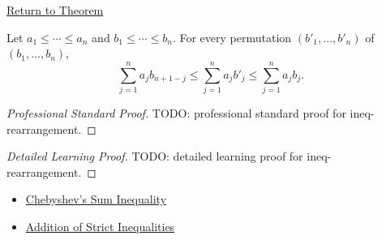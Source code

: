 \newpage
{}
\label{prf:ineq-rearrangement}

\begin{remark*}[Return]
\hyperref[thm:ineq-rearrangement]{Return to Theorem}
\end{remark*}

\begin{theorem*}
Let $a_1\le\cdots\le a_n$ and $b_1\le\cdots\le b_n$. For every permutation
$(b'_1,\dots,b'_n)$ of $(b_1,\dots,b_n)$,
\[
\sum_{j=1}^{n}a_jb_{n+1-j}
\le
\sum_{j=1}^{n}a_jb'_j
\le
\sum_{j=1}^{n}a_jb_j.
\]
\end{theorem*}

\begin{proof}[Professional Standard Proof]
\LRAProofBodyStart
TODO: professional standard proof for ineq-rearrangement.
\end{proof}

\begin{proof}[Detailed Learning Proof]
\LRAProofBodyStart
TODO: detailed learning proof for ineq-rearrangement.
\end{proof}

\begin{remark*}
\end{remark*}

\begin{dependencies}
\begin{itemize}
  \item \hyperref[thm:ineq-chebyshev-sum]{Chebyshev's Sum Inequality}
  \item \hyperref[thm:ineq-add-inequalities]{Addition of Strict Inequalities}
\end{itemize}
\end{dependencies}

\clearpage

